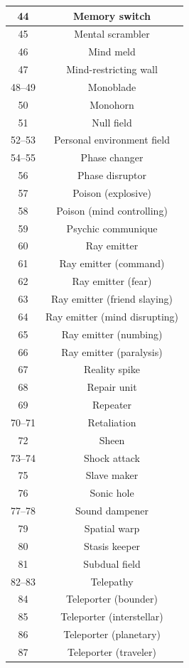 \begin{longtable}{| c | c |}
44 & Memory switch \\ \hline
45 & Mental scrambler \\ \hline
46 & Mind meld \\ \hline
47 & Mind-restricting wall \\ \hline
48–49 & Monoblade \\ \hline
50 & Monohorn \\ \hline
51 & Null field \\ \hline
52–53 & Personal environment field \\ \hline
54–55 & Phase changer \\ \hline
56 & Phase disruptor \\ \hline
57 & Poison (explosive) \\ \hline
58 & Poison (mind controlling) \\ \hline
59 & Psychic communique \\ \hline
60 & Ray emitter \\ \hline
61 & Ray emitter (command) \\ \hline
62 & Ray emitter (fear) \\ \hline
63 & Ray emitter (friend slaying) \\ \hline
64 & Ray emitter (mind disrupting) \\ \hline
65 & Ray emitter (numbing) \\ \hline
66 & Ray emitter (paralysis) \\ \hline
67 & Reality spike \\ \hline
68 & Repair unit \\ \hline
69 & Repeater \\ \hline
70–71 & Retaliation \\ \hline
72 & Sheen \\ \hline
73–74 & Shock attack \\ \hline
75 & Slave maker \\ \hline
76 & Sonic hole \\ \hline
77–78 & Sound dampener  \\ \hline
79 & Spatial warp \\ \hline
80 & Stasis keeper \\ \hline
81 & Subdual field \\ \hline
82–83 & Telepathy \\ \hline
84 & Teleporter (bounder) \\ \hline
85 & Teleporter (interstellar) \\ \hline
86 & Teleporter (planetary) \\ \hline
87 & Teleporter (traveler) \\ \hline

\end{longtable}
